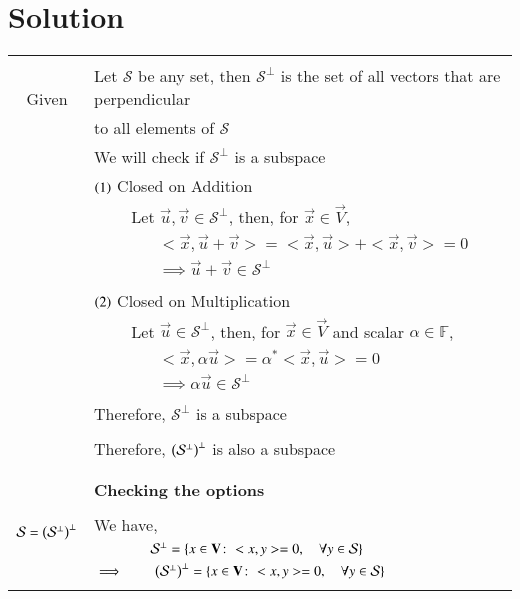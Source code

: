 \documentclass[journal,12pt]{IEEEtran}
\begin{document}
\section{\textbf{Solution}}
\renewcommand{\thetable}{2}
\begin{longtable}{|c|l|}
    \hline
    \multirow{3}{*}{Given} 
	& \\
	& Let $\mathcal{S}$ be any set, then $\mathcal{S}^{\perp}$ is the set of all vectors that are perpendicular\\
	&to all elements of $\mathcal{S}$\\
	&We will check if $\mathcal{S}^{\perp}$ is a subspace\\
	&$\left(1\right)$ Closed on Addition\\
	& $\qquad$ Let $\vec{u},\vec{v} \in \mathcal{S}^{\perp}$, then, for $\vec{x}\in\vec{V}$,\\
	& $\qquad\qquad<\vec{x},\vec{u}+\vec{v}>=<\vec{x},\vec{u}>+<\vec{x},\vec{v}>=0$\\
	&$\qquad\qquad\implies \vec{u}+\vec{v} \in \mathcal{S}^{\perp}$\\
	&\\
	&$\left(2\right)$ Closed on Multiplication\\
	& $\qquad$ Let $\vec{u}\in \mathcal{S}^{\perp}$, then, for $\vec{x}\in\vec{V}$ and scalar $\alpha\in\mathbb{F}$,\\
	& $\qquad\qquad<\vec{x},\alpha \vec{u}>=\alpha^{*}<\vec{x},\vec{u}>=0$\\
	&$\qquad\qquad\implies \alpha \vec{u} \in \mathcal{S}^{\perp}$\\
	&\\
	&Therefore, $\mathcal{S}^{\perp}$ is a subspace\\
	&\\
	&Therefore, $\left(\mathcal{S}^{\perp}\right)^{\perp}$ is also a subspace\\
	&\\
	\hline
	&\\
	&\textbf{Checking the options}\\
	\hline
	\multirow{3}{*}{$\mathcal{S}=\left(\mathcal{S}^{\perp}\right)^{\perp}$} 
	& \\
	& We have,\\
	&$\qquad\qquad\mathcal{S}^{\perp}=\left\{x\in\mathbf{V}\colon<x,y>=0,\quad\forall y\in\mathcal{S}\right\}$\\
	&$\implies \qquad\left(\mathcal{S}^{\perp}\right)^{\perp}=\left\{x\in\mathbf{V}\colon<x,y>=0,\quad\forall y\in\mathcal{S}\right\}$\\
	&\\

\end{longtable}
\end{document}
